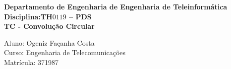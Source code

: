 \documentclass[a4paper,12pt]{article}
\begin{document}
{
%
     {\sf
       \vspace*{4cm}
      \begin{center}
         {\Large {\bfseries Departamento de Engenharia de Engenharia de Teleinformática}}\\
         \vspace*{1.0cm}
         {\Large{\bfseries Disciplina:TH$0119$ -- PDS}}\\
         \vspace*{1.0cm}
         {\large{\bfseries TC - Convolução Circular}}
     \end{center}
 \vspace*{12.0cm}
    {\Large
        \begin{flushleft}
	       \noindent Aluno: Ogeniz Façanha Costa\\
	       Curso: Engenharia de Telecomunicações\\
	       Matrícula: 371987\\
        \end{flushleft}}
    }
%
\newpage
%
% 
%

}
%
%
%
%
\end{document}

